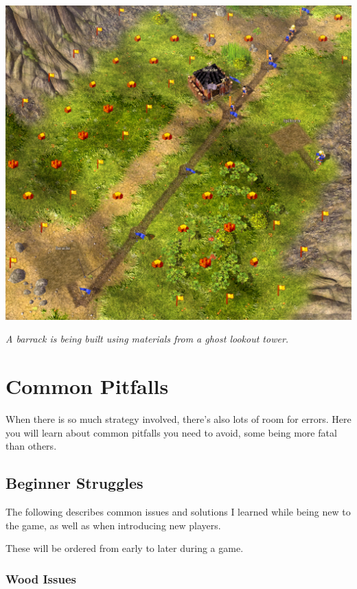 \documentclass[12pt]{article}
\begin{document}
\includegraphics[width=\textwidth]{ghostbuilding_crop}

\textit{A barrack is being built using materials from a ghost lookout tower.}


\section{Common Pitfalls}
\label{sec:commonpitfalls}

When there is so much strategy involved, there's also lots of room for errors. Here you will learn about common pitfalls you need to avoid, some being more fatal than others.

\subsection{Beginner Struggles}
\label{sec:beginnerstruggles}

The following describes common issues and solutions I learned while being new to the game, as well as when introducing new players.

These will be ordered from early to later during a game.

\subsubsection{Wood Issues}
\label{sec:woodissues}
\end{document}
